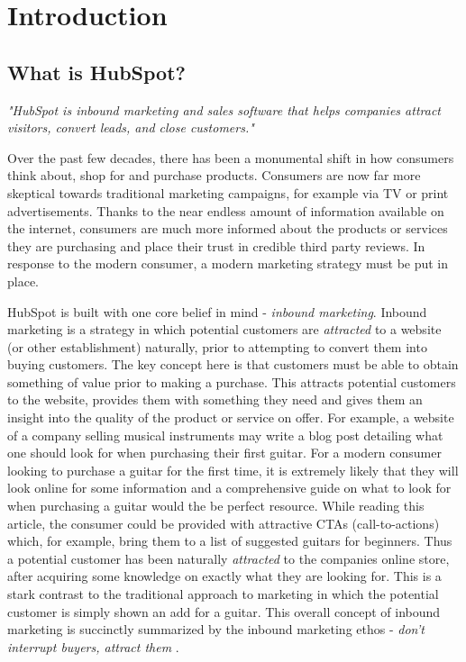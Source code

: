 \chapter{Introduction}

\section{What is HubSpot?}
\textit{"HubSpot is inbound marketing and sales software that helps companies attract visitors, convert leads, and close customers."} \cite{whatIsHubSpot}\hfill\break

Over the past few decades, there has been a monumental shift in how consumers think about, shop for and purchase products. Consumers are now far more skeptical towards traditional marketing campaigns, for example via TV or print advertisements. Thanks to the near endless amount of information available on the internet, consumers are much more informed about the products or services they are purchasing and place their trust in credible third party reviews. In response to the modern consumer, a modern marketing strategy must be put in place. 

HubSpot is built with one core belief in mind - \textit{inbound marketing}. Inbound marketing is a strategy in which potential customers are \textit{attracted} to a website (or other establishment) naturally, prior to attempting to convert them into buying customers. The key concept here is that customers must be able to obtain something of value prior to making a purchase. This attracts potential customers to the website, provides them with something they need and gives them an insight into the quality of the product or service on offer. For example, a website of a company selling musical instruments may write a blog post detailing what one should look for when purchasing their first guitar. For a modern consumer looking to purchase a guitar for the first time, it is extremely likely that they will look online for some information and a comprehensive guide on what to look for when purchasing a guitar would the be perfect resource. While reading this article, the consumer could be provided with attractive CTAs (call-to-actions) which, for example, bring them to a list of suggested guitars for beginners. Thus a potential customer has been naturally \textit{attracted} to the companies online store, after acquiring some knowledge on exactly what they are looking for. This is a stark contrast to the traditional approach to marketing in which the potential customer is simply shown an add for a guitar. This overall concept of inbound marketing is succinctly summarized by the inbound marketing ethos - \textit{don't interrupt buyers, attract them} \cite{whatIsHubSpot}.


